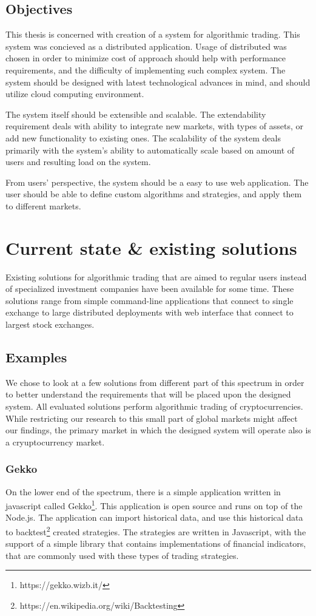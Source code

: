 \section{Objectives}
This thesis is concerned with creation of a system for algorithmic trading. This system was concieved
as a distributed application. Usage of distributed was chosen in order to minimize cost of
approach should help with performance requirements,
and the difficulty of implementing such complex system. The system should be designed with latest technological advances in mind, and
should utilize cloud computing environment.

The system itself should be extensible and scalable. The extendability requirement deals with ability to integrate new markets,
with types of assets, or add new functionality to existing ones. The scalability of the system deals primarily with the system's
ability to automatically scale based on amount of users and resulting load on the system.

From users' perspective, the system should be a easy to use web application. The user should be able to define custom
algorithms and strategies, and apply them to different markets.

\chapter{Current state \& existing solutions}
\label{chapter:current_state}
Existing solutions for algorithmic trading that are aimed to regular users instead of specialized investment companies
have been available for some time. These solutions range from simple command-line applications that connect to single exchange
to large distributed deployments with web interface that connect to largest stock exchanges\cite{Agopyan_financialbusiness}.

\section{Examples}
We chose to look at a few solutions from different part of this spectrum in order to better understand the requirements
that will be placed upon the designed system. All evaluated solutions perform algorithmic trading of cryptocurrencies.
While restricting our research to this small part of global markets might affect our findings, the primary
market in which the designed system will operate also is a cryuptocurrency market.

\subsection{Gekko}
On the lower end of the spectrum, there is a simple application written in javascript called Gekko\footnote{https://gekko.wizb.it/}.
This application is open source and runs on top of the Node.js. The application can import historical data,
and use this historical data to backtest\footnote{https://en.wikipedia.org/wiki/Backtesting} created strategies. The strategies are written in Javascript, with the support
of a simple library that contains implementations of financial indicators, that are commonly used with these types
of trading strategies.

